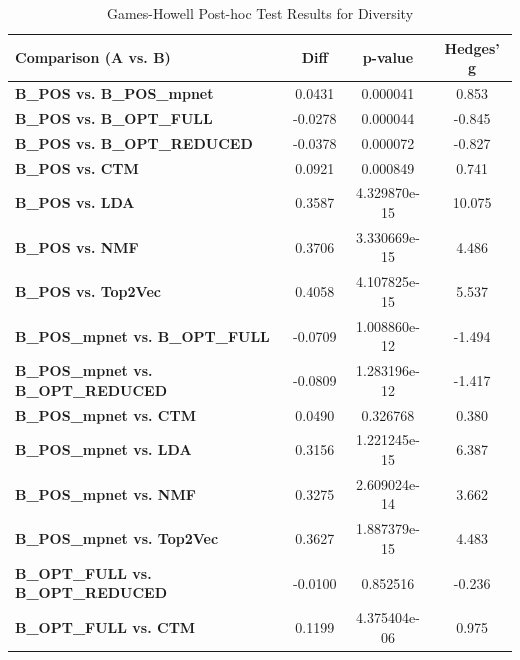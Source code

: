 \begin{table}[ht]
    \centering
    \caption{Games-Howell Post-hoc Test Results for Diversity}
    \label{tab:games_howell_diversity}
    \begin{tabular}{lccc}
        \toprule
        \textbf{Comparison (A vs. B)}              & \textbf{Diff} & \textbf{p-value} & \textbf{Hedges' g} \\
        \midrule
        \textbf{B\_POS vs. B\_POS\_mpnet}          & 0.0431        & 0.000041         & 0.853              \\
        \textbf{B\_POS vs. B\_OPT\_FULL}           & -0.0278       & 0.000044         & -0.845             \\
        \textbf{B\_POS vs. B\_OPT\_REDUCED}        & -0.0378       & 0.000072         & -0.827             \\
        \textbf{B\_POS vs. CTM}                    & 0.0921        & 0.000849         & 0.741              \\
        \textbf{B\_POS vs. LDA}                    & 0.3587        & 4.329870e-15     & 10.075             \\
        \textbf{B\_POS vs. NMF}                    & 0.3706        & 3.330669e-15     & 4.486              \\
        \textbf{B\_POS vs. Top2Vec}                & 0.4058        & 4.107825e-15     & 5.537              \\
        \textbf{B\_POS\_mpnet vs. B\_OPT\_FULL}    & -0.0709       & 1.008860e-12     & -1.494             \\
        \textbf{B\_POS\_mpnet vs. B\_OPT\_REDUCED} & -0.0809       & 1.283196e-12     & -1.417             \\
        \textbf{B\_POS\_mpnet vs. CTM}             & 0.0490        & 0.326768         & 0.380              \\
        \textbf{B\_POS\_mpnet vs. LDA}             & 0.3156        & 1.221245e-15     & 6.387              \\
        \textbf{B\_POS\_mpnet vs. NMF}             & 0.3275        & 2.609024e-14     & 3.662              \\
        \textbf{B\_POS\_mpnet vs. Top2Vec}         & 0.3627        & 1.887379e-15     & 4.483              \\
        \textbf{B\_OPT\_FULL vs. B\_OPT\_REDUCED}  & -0.0100       & 0.852516         & -0.236             \\
        \textbf{B\_OPT\_FULL vs. CTM}              & 0.1199        & 4.375404e-06     & 0.975              \\

\end{tabular}
\end{table}
